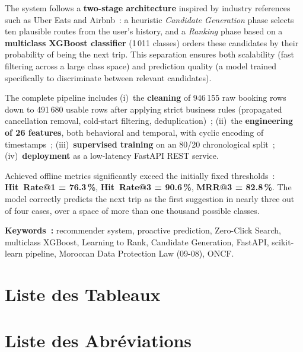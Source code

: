 \documentclass[11pt, a4paper]{article}
\begin{document}
The system follows a \textbf{two-stage architecture} inspired by industry
references such as Uber Eats and Airbnb~: a heuristic
\textit{Candidate Generation} phase selects ten plausible routes from the
user's history, and a \textit{Ranking} phase based on a \textbf{multiclass
XGBoost classifier} (1\,011 classes) orders these candidates by their
probability of being the next trip. This separation ensures both scalability
(fast filtering across a large class space) and prediction quality (a model
trained specifically to discriminate between relevant candidates).

The complete pipeline includes (i)~the \textbf{cleaning} of 946\,155 raw
booking rows down to 491\,680 usable rows after applying strict business rules
(propagated cancellation removal, cold-start filtering, deduplication)~;
(ii)~the \textbf{engineering of 26 features}, both behavioral and temporal,
with cyclic encoding of timestamps~; (iii)~\textbf{supervised training} on an
80/20 chronological split~; (iv)~\textbf{deployment} as a low-latency FastAPI
REST service.

Achieved offline metrics significantly exceed the initially fixed thresholds~:
\textbf{Hit~Rate@1 = 76.3\,\%}, \textbf{Hit~Rate@3 = 90.6\,\%},
\textbf{MRR@3 = 82.8\,\%}. The model correctly predicts the next trip as the
first suggestion in nearly three out of four cases, over a space of more than
one thousand possible classes.

\bigskip
\noindent\textbf{Keywords~:} recommender system, proactive prediction,
Zero-Click Search, multiclass XGBoost, Learning to Rank, Candidate Generation,
FastAPI, scikit-learn pipeline, Moroccan Data Protection Law (09-08), ONCF.

\newpage
\tableofcontents

\newpage
\section*{Liste des Tableaux}
\listoftables

\newpage
\section*{Liste des Abréviations}
\end{document}
